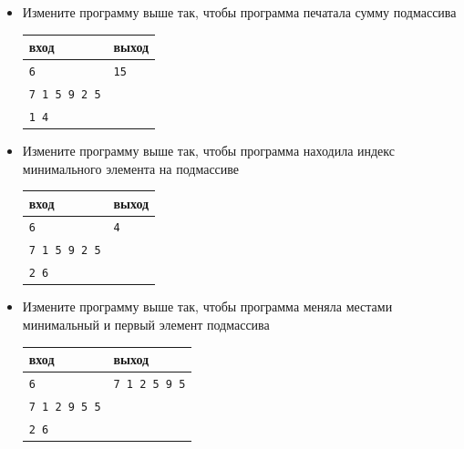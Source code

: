 \documentclass{article}
\begin{document}
\begin{itemize}
\item Измените программу выше так, чтобы программа печатала сумму подмассива
\begin{center}
\begin{tabular}{ l | l }
 вход & выход \\ \hline
 \texttt{6} & \texttt{15}  \\ 
 \texttt{7 1 5 9 2 5} &   \\ 
 \texttt{1 4} &   \\ 
\end{tabular}
\end{center}

\item Измените программу выше так, чтобы программа находила индекс минимального элемента на подмассиве
\begin{center}
\begin{tabular}{ l | l }
 вход & выход \\ \hline
 \texttt{6} & \texttt{4}  \\ 
 \texttt{7 1 5 9 2 5} &   \\ 
 \texttt{2 6} &   \\ 
\end{tabular}
\end{center}

\item Измените программу выше так, чтобы программа меняла местами минимальный и первый элемент подмассива
\begin{center}
\begin{tabular}{ l | l }
 вход & выход \\ \hline
 \texttt{6} & \texttt{7 1 2 5 9 5}  \\ 
 \texttt{7 1 2 9 5 5} &   \\ 
 \texttt{2 6} &   \\ 
\end{tabular}
\end{center}
\end{itemize}

\newpage
\end{document}
